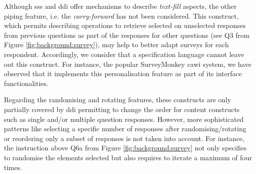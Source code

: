 	Although \gls{sss} and \gls{ddi} offer mechanisms to describe \emph{text-fill} aspects, the other piping feature, i.e. the \emph{carry-forward} has not been considered. This construct, which permits describing operations to retrieve selected on unselected responses from previous questions as part of the responses for other questions (see Q3 from Figure \ref{fig:background:survey}), may help to better adapt surveys for each respondent. Accordingly, we consider that a specification language cannot leave out this construct. For instance, the popular SurveyMonkey \gls{cawi} system, we have observed that it implements this personalisation feature as part of its interface functionalities.

	Regarding the randomising and rotating features, these constructs are only partially covered by \gls{ddi} permitting to change the order for content constructs such as single and/or multiple question responses. However, more sophisticated patterns like selecting a specific number of responses after randomising/rotating or reordering only a subset of responses is not taken into account. For instance, the instruction above Q6a from Figure \ref{fig:background:survey} not only specifies to randomise the elements selected but also requires to iterate a maximum of four times.